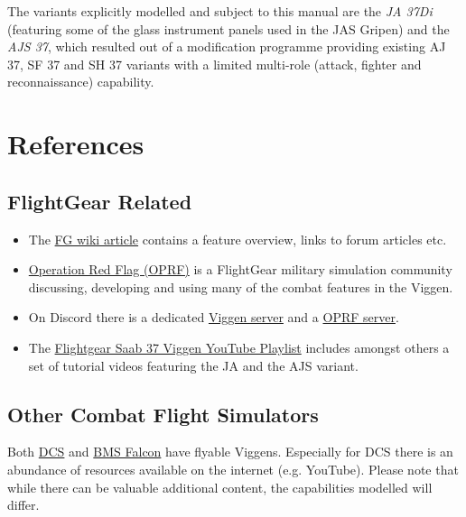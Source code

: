 The variants explicitly modelled and subject to this manual are the \emph{JA 37Di} (featuring some of the glass instrument panels used in the JAS Gripen) and the \emph{AJS 37}, which resulted out of a modification programme providing existing AJ 37, SF 37 and SH 37 variants with a limited multi-role (attack, fighter and reconnaissance) capability.

\section{References}
\subsection{FlightGear Related}
\begin{itemize}
\item The \href{http://wiki.flightgear.org/Saab_37_Viggen}{FG wiki article} contains a feature overview, links to forum articles etc.
\item \href{http://opredflag.com/}{Operation Red Flag (OPRF)} is a FlightGear military simulation community discussing, developing and using many of the combat features in the Viggen.
\item On Discord there is a dedicated \href{https://discord.gg/jc5pSM5}{Viggen server} and a \href{https://discord.gg/SmGFnJN}{OPRF server}.
\item The \href{https://www.youtube.com/playlist?list=PLogi97V-ki0GfCLqimTtIq9RIVcm-GRFE}{Flightgear Saab 37 Viggen YouTube Playlist} includes amongst others a set of tutorial videos featuring the JA and the AJS variant.
\end{itemize}

\subsection{Other Combat Flight Simulators}
Both \href{https://www.digitalcombatsimulator.com/en/index.php}{DCS} and \href{https://www.benchmarksims.org/}{BMS Falcon} have flyable Viggens. Especially for DCS there is an abundance of resources available on the internet (e.g. YouTube). Please note that while there can be valuable additional content, the capabilities modelled will differ.

